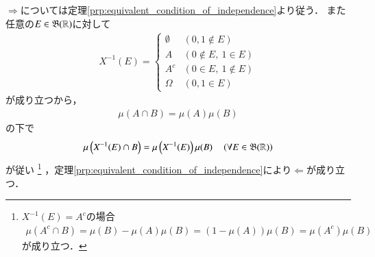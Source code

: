 	\begin{prf}
		$\Rightarrow$については定理\ref{prp:equivalent_condition_of_independence}より従う．
		また任意の$E \in \mathfrak{B}(\mathbb{R})$に対して
		\begin{align}
			X^{-1}(E) =
			\begin{cases}
				\emptyset & (0,1 \notin E) \\
				A & (0 \notin E,\ 1 \in E) \\
				A^c & (0 \in E,\ 1 \notin E) \\
				\Omega & (0, 1 \in E)
			\end{cases}
		\end{align}
		が成り立つから，
		\begin{align}
			\mu(A \cap B) = \mu(A)\mu(B)
		\end{align}
		の下で
		\begin{align}
			\mu\left( X^{-1}(E) \cap B \right) = \mu\left( X^{-1}(E) \right)\mu(B)
			\quad \left( \forall E \in \mathfrak{B}(\mathbb{R}) \right)
		\end{align}
		が従い
		\footnote{
			$X^{-1}(E) = A^c$の場合
			\begin{align}
				\mu(A^c \cap B) = \mu(B) - \mu(A)\mu(B)  = (1 - \mu(A))\mu(B) = \mu(A^c)\mu(B)
			\end{align}
			が成り立つ．
		}
		，定理\ref{prp:equivalent_condition_of_independence}により$\Leftarrow$が成り立つ．
		\QED
	\end{prf}